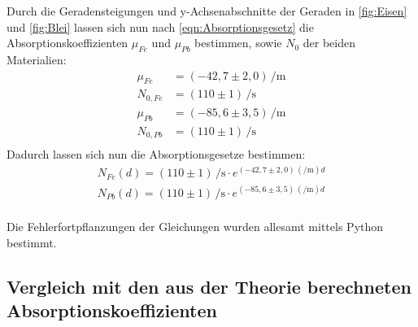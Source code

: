 Durch die Geradensteigungen und y-Achsenabschnitte der Geraden in \autoref{fig:Eisen} und \autoref{fig:Blei} 
lassen sich nun nach \autoref{eqn:Absorptionsgesetz} die Absorptionskoeffizienten $\mu_{Fe}$ und $\mu_{Pb}$ 
bestimmen, sowie $N_0$ der beiden Materialien:\\
\begin{align*}
  \mu_{Fe} &= (-42,7 \pm 2,0) \, \si{\per\meter} \\
  N_{0,Fe} &= (110 \pm 1) \, \si{\per\second} \\
  \mu_{Pb} &= (-85,6 \pm 3,5) \, \si{\per\meter} \\
  N_{0,Pb} &= (110 \pm 1) \, \si{\per\second} \\
\end{align*}
Dadurch lassen sich nun die Absorptionsgesetze bestimmen:
\begin{align*}
  N_{Fe}(d) = (110 \pm 1) \, \si{\per\second} \cdot e^{(-42,7 \pm 2,0) \, (\si{\per\meter}) d} \\
  N_{Pb}(d) = (110 \pm 1) \, \si{\per\second} \cdot e^{(-85,6 \pm 3,5) \, (\si{\per\meter}) d} \\
\end{align*}

Die Fehlerfortpflanzungen der Gleichungen wurden allesamt mittels Python bestimmt.

\subsection{Vergleich mit den aus der Theorie berechneten Absorptionskoeffizienten}

